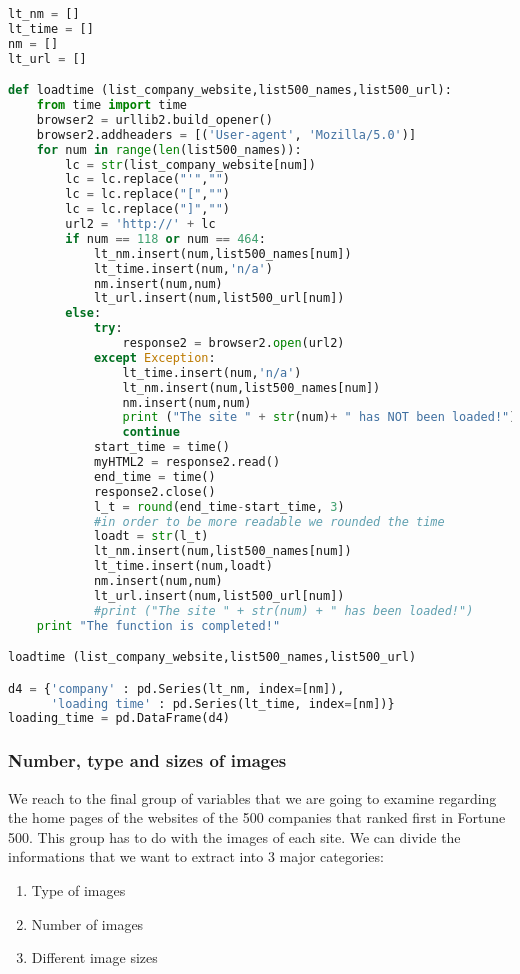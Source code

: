 \documentclass{article}
\begin{document}
\begin{lstlisting}[language=Python]
lt_nm = [] 
lt_time = []
nm = []
lt_url = []

def loadtime (list_company_website,list500_names,list500_url):
    from time import time
    browser2 = urllib2.build_opener()
    browser2.addheaders = [('User-agent', 'Mozilla/5.0')]
    for num in range(len(list500_names)):
        lc = str(list_company_website[num])        
        lc = lc.replace("'","")   
        lc = lc.replace("[","")
        lc = lc.replace("]","")
        url2 = 'http://' + lc
        if num == 118 or num == 464:            
            lt_nm.insert(num,list500_names[num])            
            lt_time.insert(num,'n/a')
            nm.insert(num,num)
            lt_url.insert(num,list500_url[num])           
        else:
            try:
                response2 = browser2.open(url2)
            except Exception:
                lt_time.insert(num,'n/a')
                lt_nm.insert(num,list500_names[num])  
                nm.insert(num,num)
                print ("The site " + str(num)+ " has NOT been loaded!")
                continue     
            start_time = time()
            myHTML2 = response2.read()
            end_time = time()
            response2.close()
            l_t = round(end_time-start_time, 3) 
            #in order to be more readable we rounded the time
            loadt = str(l_t)
            lt_nm.insert(num,list500_names[num])            
            lt_time.insert(num,loadt)
            nm.insert(num,num)
            lt_url.insert(num,list500_url[num])
            #print ("The site " + str(num) + " has been loaded!")
    print "The function is completed!"

loadtime (list_company_website,list500_names,list500_url)

d4 = {'company' : pd.Series(lt_nm, index=[nm]),
      'loading time' : pd.Series(lt_time, index=[nm])}
loading_time = pd.DataFrame(d4)    
\end{lstlisting}
\subsubsection{Number, type and sizes of images}
We reach to the final group of variables that we are going to examine regarding the home pages of the websites of the 500 companies that ranked first in Fortune 500. This group has to do with the images of each site. We can divide the informations that we want to extract into 3 major categories:
\begin{enumerate}
\item Type of images
\item Number of images
\item Different image sizes
\end{enumerate}
\end{document}

